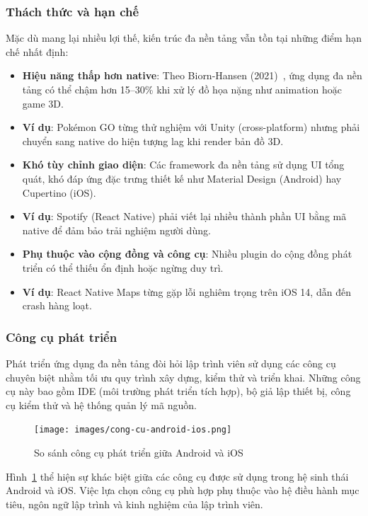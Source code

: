 \subsubsection{Thách thức và hạn chế}

    Mặc dù mang lại nhiều lợi thế, kiến trúc đa nền tảng vẫn tồn tại những điểm hạn chế nhất định:
    \setlength{\leftmargini}{1.5cm}
    \begin{itemize}
        \item \textbf{Hiệu năng thấp hơn native}: Theo Biorn-Hansen (2021)~\cite{biornhansen2021}, ứng dụng đa nền tảng có thể chậm hơn 15–30\% khi xử lý đồ họa nặng như animation hoặc game 3D.
        \item \textbf{Ví dụ}: Pokémon GO từng thử nghiệm với Unity (cross-platform) nhưng phải chuyển sang native do hiện tượng lag khi render bản đồ 3D.
        \item \textbf{Khó tùy chỉnh giao diện}: Các framework đa nền tảng sử dụng UI tổng quát, khó đáp ứng đặc trưng thiết kế như Material Design (Android) hay Cupertino (iOS).
        \item \textbf{Ví dụ}: Spotify (React Native) phải viết lại nhiều thành phần UI bằng mã native để đảm bảo trải nghiệm người dùng.
        \item \textbf{Phụ thuộc vào cộng đồng và công cụ}: Nhiều plugin do cộng đồng phát triển có thể thiếu ổn định hoặc ngừng duy trì.
        \item \textbf{Ví dụ}: React Native Maps từng gặp lỗi nghiêm trọng trên iOS 14, dẫn đến crash hàng loạt.
    \end{itemize}

\subsubsection{Công cụ phát triển}

  Phát triển ứng dụng đa nền tảng đòi hỏi lập trình viên sử dụng các công cụ chuyên biệt nhằm tối ưu quy trình xây dựng, kiểm thử và triển khai. Những công cụ này bao gồm IDE (môi trường phát triển tích hợp), bộ giả lập thiết bị, công cụ kiểm thử và hệ thống quản lý mã nguồn.

  \begin{figure}[H]
    \centering
    \texttt{[image: images/cong-cu-android-ios.png]}
    \caption{So sánh công cụ phát triển giữa Android và iOS}
    \label{fig:android_ios_tools}
  \end{figure}

  Hình~\ref{fig:android_ios_tools} thể hiện sự khác biệt giữa các công cụ được sử dụng trong hệ sinh thái Android và iOS. Việc lựa chọn công cụ phù hợp phụ thuộc vào hệ điều hành mục tiêu, ngôn ngữ lập trình và kinh nghiệm của lập trình viên.


